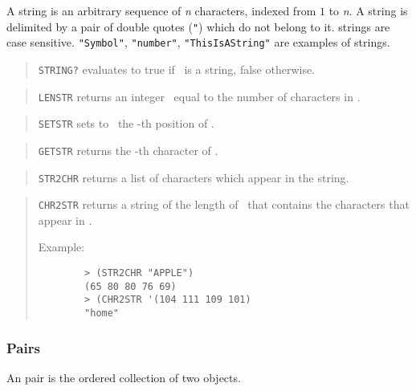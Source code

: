 A string is an arbitrary sequence of {\it n\/} characters, indexed from $1$ to
{\it n\/}.
A string is delimited by a pair of double quotes ({\tt "}) which do not belong
to it. {\HG} strings are case sensitive.
{\tt "Symbol"}, {\tt "number"}, {\tt "ThisIsAString"} are examples of {\HG}
strings.

\bigskip

\begin{quote}
	{\tt STRING?} evaluates to true if \obj\ is a string, false otherwise.
\end{quote}

\begin{quote}
	{\tt LENSTR} returns an integer \inte\ equal to the number of characters in
	\str.
\end{quote}

\begin{quote}
	{\tt SETSTR} sets to \chr\ the \inte-th position of \str.
\end{quote}

\begin{quote}
	{\tt GETSTR} returns the \inte-th character of \str.
\end{quote}

\begin{quote}
	{\tt STR2CHR} returns a list of characters which appear in the string.
\end{quote}

\begin{quote}
	{\tt CHR2STR} returns a string of the length of \chrlist\ that contains the
	characters that appear in \chrlist.

	Example:
	\begin{verbatim}
		> (STR2CHR "APPLE")
		(65 80 80 76 69)
		> (CHR2STR '(104 111 109 101)
		"home"
	\end{verbatim}
\end{quote}


\subsubsection{Pairs}

An {\HG} pair is the ordered collection of two {\HG} objects.

